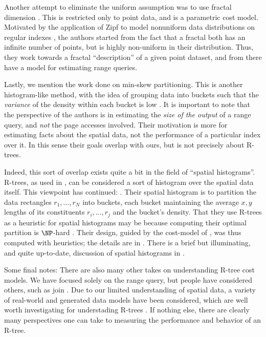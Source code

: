 Another attempt to eliminate the uniform assumption was to use fractal dimension \cite{faloutsoskamel94}. This is restricted only to point data, and is a parametric cost model. Motivated by the application of Zipf to model nonuniform data distributions on regular indexes \cite{ioannidischristodoulakis91}, the authors started from the fact that a fractal both has an infinite number of points, but is highly non-uniform in their distribution. Thus, they work towards a fractal ``description'' of a given point dataset, and from there have a model for estimating range queries.

Lastly, we mention the work done on min-skew partitioning.
This is another histogram-like method, with the idea of grouping data into buckets such that the \emph{variance} of the density within each bucket is low \cite{acharyapoosalaramaswamy99}.
It is important to note that the perspective of the authors is in estimating the \emph{size of the output} of a range query, and \emph{not} the page accesses involved.
Their motivation is more for estimating facts about the spatial data, not the performance of a particular index over it.
In this sense their goals overlap with ours, but is not precisely about R-trees.

Indeed, this sort of overlap exists quite a bit in the field of ``spatial histograms''.
R-trees, as used in \cite{acharyapoosalaramaswamy99}, can be considered a sort of histogram over the spatial data itself.
This viewpoint has continued: \cite{achakeevseeger12}.
Their spatial histogram is to partition the data rectangles $r_1,\ldots,r_N$ into buckets, each bucket maintaining the average $x,y$ lengths of its constituents $r_i,\ldots,r_j$ and the bucket's density.
That they use R-trees as a heuristic for spatial histograms may be because computing their optimal partition is $\NP$-hard \cite{muthukrishnanpoosalasuel99}.
Their design, guided by the cost-model of \cite{theodoridissellis96}, was thus computed with heuristics; the details are in \cite{achakeevseeger12a}.
There is a brief but illuminating, and quite up-to-date, discussion of spatial histograms in \cite{mamoulis11}.

Some final notes:
There are also many other takes on understanding R-tree cost models.
We have focused solely on the range query, but people have considered others, such as join \cite{thebook,aboulnaganaughton00}.
Due to our limited understanding of spatial data, a variety of real-world and generated data models have been considered, which are well worth investigating for understading R-trees \cite{aboulnaganaughton00, anyangsivasubramaniam01, achakeevseeger12,achakeevseeger12a}.
If nothing else, there are clearly many perspectives one can take to measuring the performance and behavior of an R-tree.

